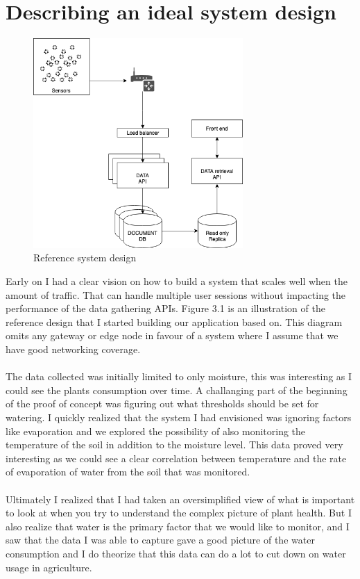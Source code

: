 \documentclass[]{uiophd}
\begin{document}
\section{Describing an ideal system design}
\begin{figure}[h]
\caption{Reference system design}
\centering
\includegraphics[width=8cm]{ideal_system_design.png}

\end{figure}
Early on I had a clear vision on how to build a system that scales well when the amount of traffic. That can handle multiple user sessions without impacting the performance of the data gathering APIs. Figure 3.1 is an illustration of the reference design that I started building our application based on. This diagram omits any gateway or edge node in favour of a system where I assume that we have good networking coverage.
\\\\
The data collected was initially limited to only moisture, this was interesting as I could see the plants consumption over time. A challanging part of the beginning of the proof of concept was figuring out what thresholds should be set for watering. I quickly realized that the system I had envisioned was ignoring factors like evaporation and we explored the possibility of also monitoring the temperature of the soil in addition to the moisture level. This data proved very interesting as we could see a clear correlation between temperature and the rate of evaporation of water from the soil that was monitored.
\\\\
Ultimately I realized that I had taken an oversimplified view of what is important to look at when you try to understand the complex picture of plant health. But I also realize that water is the primary factor that we would like to monitor, and I saw that the data I was able to capture gave a good picture of the water consumption and I do theorize that this data can do a lot to cut down on water usage in agriculture.
\end{document}
